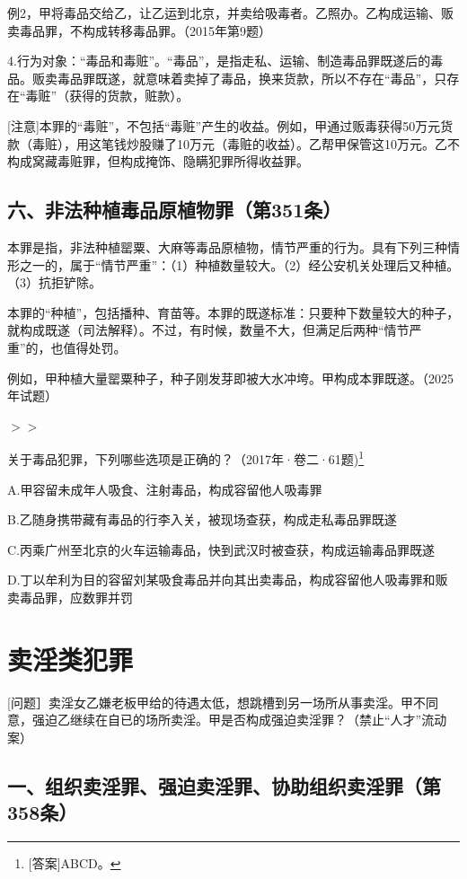 例2，甲将毒品交给乙，让乙运到北京，并卖给吸毒者。乙照办。乙构成运输、贩卖毒品罪，不构成转移毒品罪。（2015年第9题）

4.行为对象：“毒品和毒赃”。“毒品”，是指走私、运输、制造毒品罪既遂后的毒品。贩卖毒品罪既遂，就意味着卖掉了毒品，换来货款，所以不存在“毒品”，只存在“毒赃”（获得的货款，赃款）。

[注意]本罪的“毒赃”，不包括“毒赃”产生的收益。例如，甲通过贩毒获得50万元货款（毒赃），用这笔钱炒股赚了10万元（毒赃的收益）。乙帮甲保管这10万元。乙不构成窝藏毒赃罪，但构成掩饰、隐瞒犯罪所得收益罪。

\subsection*{六、非法种植毒品原植物罪（第351条）}

本罪是指，非法种植罂粟、大麻等毒品原植物，情节严重的行为。具有下列三种情形之一的，属于“情节严重”：（1）种植数量较大。（2）经公安机关处理后又种植。（3）抗拒铲除。

本罪的“种植”，包括播种、育苗等。本罪的既遂标准：只要种下数量较大的种子，就构成既遂（司法解释）。不过，有时候，数量不大，但满足后两种“情节严重”的，也值得处罚。

例如，甲种植大量罂粟种子，种子刚发芽即被大水冲垮。甲构成本罪既遂。（2025年试题）


\ensuremath{>}\ensuremath{>}

关于毒品犯罪，下列哪些选项是正确的？（2017年·卷二·61题)\footnote{[答案]ABCD。}

A.甲容留未成年人吸食、注射毒品，构成容留他人吸毒罪

B.乙随身携带藏有毒品的行李入关，被现场查获，构成走私毒品罪既遂

C.丙乘广州至北京的火车运输毒品，快到武汉时被查获，构成运输毒品罪既遂

D.丁以牟利为目的容留刘某吸食毒品并向其出卖毒品，构成容留他人吸毒罪和贩卖毒品罪，应数罪并罚

\section{卖淫类犯罪}

[问题］卖淫女乙嫌老板甲给的待遇太低，想跳槽到另一场所从事卖淫。甲不同意，强迫乙继续在自已的场所卖淫。甲是否构成强迫卖淫罪？（禁止“人才”流动案）

\subsection*{一、组织卖淫罪、强迫卖淫罪、协助组织卖淫罪（第358条）}

